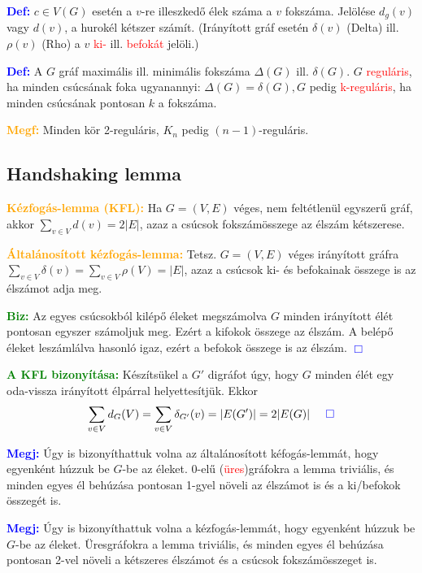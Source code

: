 \documentclass[../szamtud.tex]{subfiles}
\begin{document}
        \textcolor{blue}{\textbf{Def:}} $c \in V(G)$ esetén a $v$-re illeszkedő élek száma a $v$ fokszáma. Jelölése $d_g(v)$ vagy $d(v)$, a hurokél kétszer számít. (Irányított gráf esetén $\delta(v)$ (Delta) ill. $\rho(v)$ (Rho) a $v$ \textcolor{red}{ki-} ill. \textcolor{red}{befokát} jelöli.)

        \textcolor{blue}{\textbf{Def:}} A $G$ gráf maximális ill. minimális fokszáma $\Delta(G)$ ill. $\delta(G)$. $G$ \textcolor{red}{reguláris}, ha minden csúcsának foka ugyanannyi: $\Delta(G)=\delta(G),G$ pedig \textcolor{red}{k-reguláris}, ha minden csúcsának pontosan $k$ a fokszáma.

        \textcolor{orange}{\textbf{Megf:}} Minden kör 2-reguláris, $K_n$ pedig $(n-1)$-reguláris.

    \subsection{Handshaking lemma}

        \textcolor{orange}{\textbf{Kézfogás-lemma (KFL):}} Ha $G = (V,E)$ véges, nem feltétlenül egyszerű gráf, akkor $\sum_{v \in V} d(v)=2|E|$, azaz a csúcsok fokszámösszege az élszám kétszerese.

        \textcolor{orange}{\textbf{Általánosított kézfogás-lemma:}} Tetsz. $G = (V,E)$ véges irányított gráfra $\sum_{v \in V} \delta (v) = \sum_{v \in V} \rho (V) = |E|$, azaz a csúcsok ki- és befokainak összege is az élszámot adja meg.

        \textcolor{green}{\textbf{Biz:}} Az egyes csúcsokból kilépő éleket megszámolva $G$ minden irányított élét pontosan egyszer számoljuk meg. Ezért a kifokok összege az élszám. A belépő éleket leszámlálva hasonló igaz, ezért a befokok összege is az élszám. \textcolor{blue}{$\Box$}

        \textcolor{green}{\textbf{A KFL bizonyítása:}} Készítsükel a $G'$ digráfot úgy, hogy $G$ minden élét egy oda-vissza irányított élpárral helyettesítjük. Ekkor \[\sum_{v \in V} d_G(V) = \sum_{v \in V} \delta_{G'} (v) = |E(G')| = 2|E(G)| \;\;\;\;\;\textcolor{blue}{\Box} \]

        \textcolor{blue}{\textbf{Megj:}} Úgy is bizonyíthattuk volna az általánosított kéfogás-lemmát, hogy egyenként húzzuk be $G$-be az éleket. 0-elű (\textcolor{red}{üres})gráfokra a lemma triviális, és minden egyes él behúzása pontosan 1-gyel növeli az élszámot is és a ki/befokok összegét is.

        \textcolor{blue}{\textbf{Megj:}} Úgy is bizonyíthattuk volna a kézfogás-lemmát, hogy egyenként húzzuk be $G$-be az éleket. Üresgráfokra a lemma triviális, és minden egyes él behúzása pontosan 2-vel növeli a kétszeres élszámot és a csúcsok fokszámösszeget is.
\end{document}
